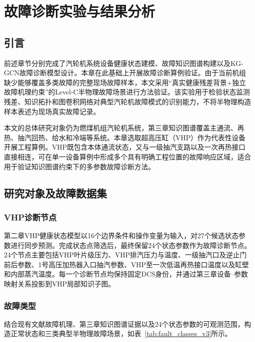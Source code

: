 \section{故障诊断实验与结果分析}
\label{sec:experiments}

\subsection{引言}

前述章节分别完成了汽轮机系统设备健康状态建模、故障知识图谱构建以及KG-GCN故障诊断模型设计。本章在此基础上开展故障诊断算例验证。由于当前机组缺少能够覆盖多类故障的完整现场故障样本，本文采用“真实健康残差背景+独立故障机理约束”的Level-C半物理故障场景进行方法验证。该实验用于检验状态监测残差、知识拓扑和图卷积网络对典型汽轮机故障模式的识别能力，不将半物理构造样本表述为现场真实故障记录。

本文的总体研究对象仍为燃煤机组汽轮机系统，第三章知识图谱覆盖主通流、再热、抽汽回热、给水和冷端等系统。本章选取超高压缸（VHP）作为代表性设备开展工程算例。VHP既包含本体通流状态，又与一级抽汽支路以及一次再热接口直接相连，可在单一设备算例中形成多个具有明确工程位置的故障响应区域，适合用于验证知识图谱约束下的多参数故障诊断方法。

\subsection{研究对象及故障数据集}
\label{subsec:fault_dataset_v3}

\subsubsection{VHP诊断节点}

第二章VHP健康状态模型以16个边界条件和操作变量为输入，对27个候选状态参数进行同步预测。完成状态点筛选后，最终保留24个状态参数作为故障诊断节点。24个节点主要包括VHP叶片级压力、VHP排汽压力与温度、一级抽汽口及逆止门前后参数、1号高压加热器入口抽汽参数、VHP至一次低温再热接口温度以及缸壁和内部蒸汽温度。每一个诊断节点均保持固定DCS身份，并通过第三章设备--参数映射关系投影到VHP局部知识子图。

\subsubsection{故障类型}

结合现有文献故障机理、第三章知识图谱证据以及24个状态参数的可观测范围，构造正常状态和三类典型半物理故障场景，如表~\ref{tab:fault_classes_v3}所示。

